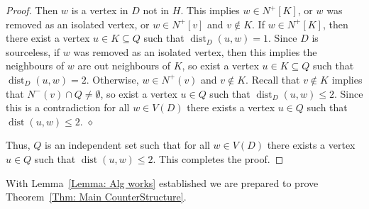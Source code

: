 \documentclass[12pt]{article}
\theoremstyle{definition}
\DeclareMathOperator{\dist}{dist}
\begin{document}
\begin{proof}
    Then $w$ is a vertex in $D$ not in $H$.
    This implies $w \in N^+[K]$, or $w$ was removed as an isolated vertex, or $w \in N^+[v]$ and $v \notin K$.
    If $w \in N^+[K]$, then there exist a vertex $u \in K \subseteq Q$ 
    such that $\dist_D(u,w) = 1$.
    Since $D$ is sourceless, if $w$ was removed as an isolated vertex, then this implies the neighbours of $w$ are out neighbours of $K$, 
    so exist a vertex $u \in K \subseteq Q$ 
    such that $\dist_D(u,w) = 2$.
    Otherwise, $w \in N^+(v)$ and $v \notin K$.
    Recall that $v \notin K$ implies that $N^-(v) \cap Q \neq \emptyset$,
    so exist a vertex $u \in Q$ 
    such that $\dist_D(u,w) \leq 2$. 
    Since this is a contradiction for all $w \in V(D)$ there exists a vertex $u\in Q$ such that $\dist(u,w)\leq 2$.
\hfill $\diamond$
\vspace{0.25cm}

Thus, $Q$ is an independent set such that for all $w \in V(D)$ there exists a vertex $u\in Q$ such that $\dist(u,w)\leq 2$.
This completes the proof.
\end{proof}

With Lemma~\ref{Lemma: Alg works} established we are prepared to prove Theorem~\ref{Thm: Main CounterStructure}.
\end{document}

